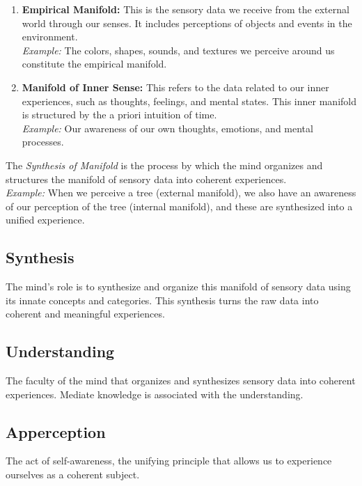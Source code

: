 \documentclass[a4paper]{article}
\begin{document}
\begin{enumerate}
    \item \textbf{Empirical Manifold:} This is the sensory data we receive from the external world through our senses. It includes perceptions of objects and events in the environment. \\
    \textit{Example:} The colors, shapes, sounds, and textures we perceive around us constitute the empirical manifold.
    \item \textbf{Manifold of Inner Sense:} This refers to the data related to our inner experiences, such as thoughts, feelings, and mental states. This inner manifold is structured by the a priori intuition of time. \\
    \textit{Example:} Our awareness of our own thoughts, emotions, and mental processes.
\end{enumerate}

The \textit{Synthesis of Manifold} is the process by which the mind organizes and structures the manifold of sensory data into coherent experiences. \\

\textit{Example:} When we perceive a tree (external manifold), we also have an awareness of our perception of the tree (internal manifold), and these are synthesized into a unified experience.

\subsection{Synthesis}
The mind's role is to synthesize and organize this manifold of sensory data using its innate concepts and categories. 
This synthesis turns the raw data into coherent and meaningful experiences.

\subsection{Understanding}
The faculty of the mind that organizes and synthesizes sensory data into coherent experiences.
Mediate knowledge is associated with the understanding.

\subsection{Apperception}
The act of self-awareness, the unifying principle that allows us to experience ourselves as a coherent subject.
\end{document}
